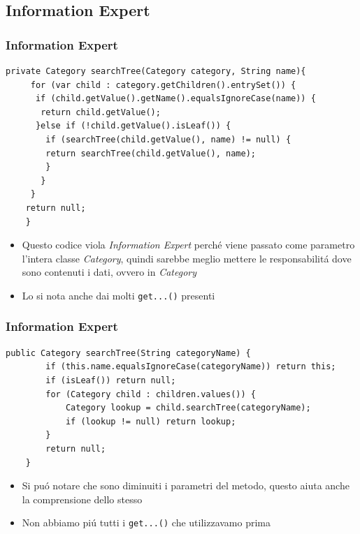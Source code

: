 \subsection{Information Expert}
    \begin{frame} [fragile]
      \frametitle{Information Expert}
        \begin{lstlisting}[autogobble, title={\texttt{CategoryController.java}}]
    private Category searchTree(Category category, String name){
     for (var child : category.getChildren().entrySet()) {
      if (child.getValue().getName().equalsIgnoreCase(name)) {
       return child.getValue();
      }else if (!child.getValue().isLeaf()) {
        if (searchTree(child.getValue(), name) != null) {
        return searchTree(child.getValue(), name);
        }
       }
     }
    return null;
    }
        \end{lstlisting}
      \begin{itemize}
          \item Questo codice viola \emph{Information Expert} perché
          viene passato come parametro l'intera classe \emph{Category}, quindi sarebbe meglio
          mettere le responsabilitá dove sono contenuti i dati, ovvero in \emph{Category}
          \item Lo si nota anche dai molti \texttt{get...()} presenti
      \end{itemize}
    \end{frame}

\begin{frame} [fragile]
    \frametitle{Information Expert}
    \begin{lstlisting}[autogobble, title={\texttt{Category.java}}]
        public Category searchTree(String categoryName) {
        if (this.name.equalsIgnoreCase(categoryName)) return this;
        if (isLeaf()) return null;
        for (Category child : children.values()) {
            Category lookup = child.searchTree(categoryName);
            if (lookup != null) return lookup;
        }
        return null;
    }
    \end{lstlisting}
    \begin{itemize}
        \item Si puó notare che sono diminuiti i parametri del metodo, questo aiuta anche la comprensione dello stesso
        \item Non abbiamo piú tutti i \texttt{get...()} che utilizzavamo prima
    \end{itemize}
\end{frame}
